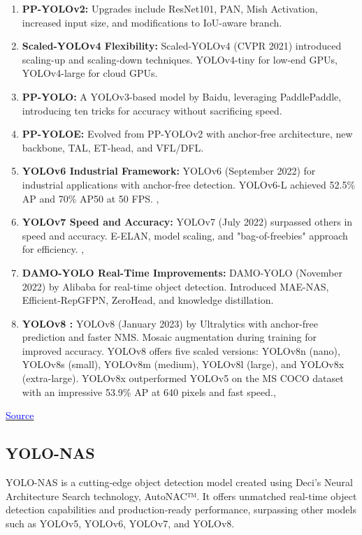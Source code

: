 \begin{enumerate}
    \item \textbf{PP-YOLOv2: }  Upgrades include ResNet101, PAN, Mish Activation, increased input size, and modifications to IoU-aware branch. \cite{huang2021pp}\\
    \item \textbf{Scaled-YOLOv4 Flexibility: } Scaled-YOLOv4 (CVPR 2021) introduced scaling-up and scaling-down techniques. YOLOv4-tiny for low-end GPUs, YOLOv4-large for cloud GPUs. \cite{wang2021scaled}\\ 
    \item \textbf{PP-YOLO: } A YOLOv3-based model by Baidu, leveraging PaddlePaddle, introducing ten tricks for accuracy without sacrificing speed.\cite{long2020pp}\\
    \item \textbf{PP-YOLOE: } Evolved from PP-YOLOv2 with anchor-free architecture, new backbone, TAL, ET-head, and VFL/DFL. \cite{xu2022pp}\\
    \item \textbf{YOLOv6 Industrial Framework: } 
    YOLOv6 (September 2022) for industrial applications with anchor-free detection.
    YOLOv6-L achieved 52.5\% AP and 70\% AP50 at 50 FPS. \cite{li2022yolov6}, \cite{terven2023comprehensive}
    \item \textbf{YOLOv7 Speed and Accuracy: } YOLOv7 (July 2022) surpassed others in speed and accuracy.
    E-ELAN, model scaling, and "bag-of-freebies" approach for efficiency. \cite{wang2023yolov7}, \cite{terven2023comprehensive}\\
    \item \textbf{DAMO-YOLO Real-Time Improvements: } DAMO-YOLO (November 2022) by Alibaba for real-time object detection. 
    Introduced MAE-NAS, Efficient-RepGFPN, ZeroHead, and knowledge distillation. \cite{xu2022damo}\\
    \item \textbf{YOLOv8 :}
    YOLOv8 (January 2023) by Ultralytics with anchor-free prediction and faster NMS. Mosaic augmentation during training for improved accuracy.
    YOLOv8 offers five scaled versions: YOLOv8n (nano), YOLOv8s (small), YOLOv8m (medium), YOLOv8l (large), and YOLOv8x (extra-large). YOLOv8x outperformed YOLOv5 on the MS COCO dataset with an impressive 53.9\% AP at 640 pixels and fast speed.\cite{yolov8}, \cite{terven2023comprehensive}
\end{enumerate}
\href{https://www.mdpi.com/2504-4990/5/4/83}{\textcolor{blue}{Source}}
\subsection{YOLO-NAS}
YOLO-NAS is a cutting-edge object detection model created using Deci's Neural Architecture Search technology, AutoNAC™. It offers unmatched real-time object detection capabilities and production-ready performance, surpassing other models such as YOLOv5, YOLOv6, YOLOv7, and YOLOv8.

